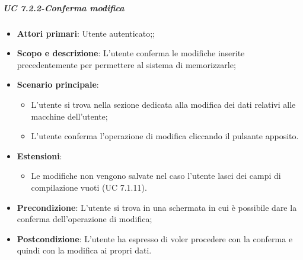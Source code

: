     \subparagraph{UC 7.2.2-Conferma modifica}
    \begin{itemize}
                \item \textbf{Attori primari}: Utente autenticato;;
                
                 \item \textbf{Scopo e descrizione}: L’utente conferma le modifiche inserite precedentemente per permettere al sistema di memorizzarle;
                 \item \textbf{Scenario principale}: 
                 \begin{itemize}
                     \item L’utente si trova nella sezione dedicata alla modifica dei dati relativi alle macchine dell'utente;
                     \item L'utente conferma l'operazione di modifica cliccando il pulsante apposito. 
                 \end{itemize}
                 \item \textbf{Estensioni}:
            \begin{itemize}
                \item Le modifiche non vengono salvate nel caso l'utente lasci dei campi di compilazione vuoti (UC 7.1.11).
            \end{itemize}
                 \item \textbf{Precondizione}: L’utente si trova in una schermata in cui è possibile dare la conferma dell'operazione di modifica;
                 \item \textbf{Postcondizione}: L’utente ha espresso di voler procedere con la conferma e quindi con la modifica ai propri dati.
                 \end{itemize}
                 
